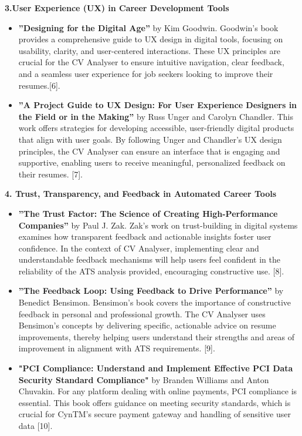 \documentclass[12pt,a4paper]{report}
\begin{document}
\textbf{3.User Experience (UX) in Career Development Tools}

\begin{itemize} \item \textbf{”Designing for the Digital Age”} by Kim Goodwin. Goodwin’s book provides a comprehensive guide to UX design in digital tools, focusing on usability, clarity, and user-centered interactions. These UX principles are crucial for the CV Analyser to ensure intuitive navigation, clear feedback, and a seamless user experience for job seekers looking to improve their resumes.[6].

\item \textbf{”A Project Guide to UX Design: For User Experience Designers in the Field or in the Making”} by Russ Unger and Carolyn Chandler. This work offers strategies for developing accessible, user-friendly digital products that align with user goals. By following Unger and Chandler’s UX design principles, the CV Analyser can ensure an interface that is engaging and supportive, enabling users to receive meaningful, personalized feedback on their resumes. [7]. \end{itemize}

\textbf{4. Trust, Transparency, and Feedback in Automated Career Tools}

\begin{itemize} \item \textbf{”The Trust Factor: The Science of Creating High-Performance Companies”} by Paul J. Zak. Zak’s work on trust-building in digital systems examines how transparent feedback and actionable insights foster user confidence. In the context of CV Analyser, implementing clear and understandable feedback mechanisms will help users feel confident in the reliability of the ATS analysis provided, encouraging constructive use. [8].

\item \textbf{”The Feedback Loop: Using Feedback to Drive Performance”} by Benedict Bensimon. Bensimon’s book covers the importance of constructive feedback in personal and professional growth. The CV Analyser uses Bensimon’s concepts by delivering specific, actionable advice on resume improvements, thereby helping users understand their strengths and areas of improvement in alignment with ATS requirements. [9].

\item \textbf{"PCI Compliance: Understand and Implement Effective PCI Data Security Standard Compliance"} by Branden Williams and Anton Chuvakin. For any platform dealing with online payments, PCI compliance is essential. This book offers guidance on meeting security standards, which is crucial for CynTM’s secure payment gateway and handling of sensitive user data [10]. \end{itemize}
\end{document}
